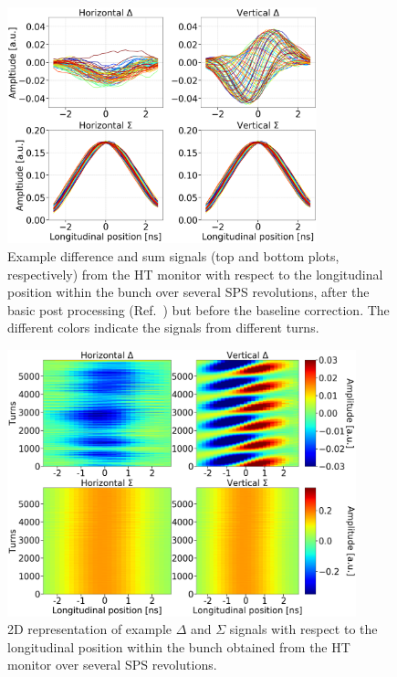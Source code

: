 

\begin{figure}[!h]
   \centering         
   \includegraphics[width=0.8\textwidth]{images/Ch4/HT_1D__20180530_135105exampleAcq_4thesis_turnsStart0_Stop6000_step100_new.png}
       \caption{Example difference and sum signals (top and bottom plots, respectively) from the HT monitor with respect to the longitudinal position within the bunch over several SPS revolutions, after the basic post processing (Ref.~\cite{Levens:2313358}) but before the baseline correction. The different colors indicate the signals from different turns.}
       \label{fig:HT_example_signals}
\end{figure}

\begin{figure}[!h]
   \centering         
   \includegraphics[width=0.9\textwidth]{images/Ch4/HT_2D__20180530_135105_colorbar_new_version.png}
       \caption{2D representation of example $\Delta$ and $\Sigma$ signals with respect to the longitudinal position within the bunch obtained from the HT monitor over several SPS revolutions.}
       \label{fig:HT_example_signals_2D}
\end{figure}


